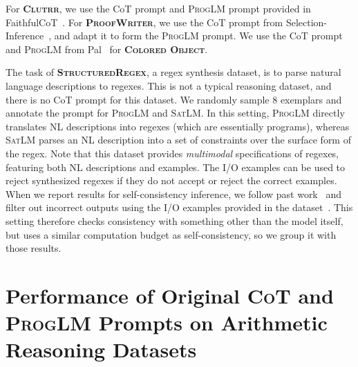 \documentclass{article}
\theoremstyle{definition}
\newcommand{\lsat}{\textsc{LSAT}}
\newcommand{\clutrr}{\textsc{Clutrr}}
\newcommand{\cotlm}{\textsc{CoT}}
\newcommand{\satlm}{\textsc{SatLM}}
\newcommand{\pallm}{\textsc{ProgLM}}
\begin{document}
 For \textbf{\clutrr{}}, we use the {\sc CoT} prompt and \pallm{} prompt provided in {\sc FaithfulCoT}~\citep{faithfulcot}. For \textbf{\textsc{ProofWriter}}, we use the {\sc CoT} prompt from {\sc Selection-Inference}~\citep{creswell2023selectioninference}, and adapt it to form the \pallm{} prompt. We use the {\sc CoT} prompt and \pallm{} from {\sc Pal}~\citep{pal} for \textbf{\textsc{Colored Object}}.
 
The task of \textbf{\textsc{StructuredRegex}}, a regex synthesis dataset, is to parse natural language descriptions to regexes. This is not a typical reasoning dataset, and there is no {\sc CoT} prompt for this dataset. We randomly sample 8 exemplars and annotate the prompt for \pallm{} and \satlm{}. In this setting, \pallm{} directly translates NL descriptions into regexes (which are essentially programs), whereas \satlm{} parses an NL description into a set of constraints over the surface form of the regex.
Note that this dataset provides \emph{multimodal} specifications of regexes, featuring both NL descriptions and examples. The I/O examples can be used to reject synthesized regexes if they do not accept or reject the correct examples.
When we report results for self-consistency inference, we follow past work~\citep{opsynth} and filter out incorrect outputs using the I/O examples provided in the dataset~\citep{structuredregex}. This setting therefore checks consistency with something other than the model itself, but uses a similar computation budget as self-consistency, so we group it with those results.




\section{Performance of Original \textsc{CoT} and \pallm{} Prompts on Arithmetic Reasoning Datasets}
\label{app:original_gsm_exs}
\end{document}
